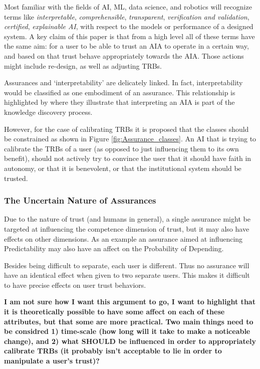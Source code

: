     Most familiar with the fields of AI, ML, data science, and robotics will recognize terms like \emph{interpretable}, \emph{comprehensible}, \emph{transparent}, \emph{verification and validation}, \emph{certified}, \emph{explainable AI}, with respect to the models or performance of a designed system. A key claim of this paper is that from a high level all of these terms have the same aim: for a user to be able to trust an AIA to operate in a certain way, and based on that trust behave appropriately towards the AIA. Those actions might include re-design, as well as adjusting TRBs.

    Assurances and `interpretability' are delicately linked. In fact, interpretability would be classified as one embodiment of an assurance. This relationship is highlighted by \citet{Vellido2012-nm} where they illustrate that interpreting an AIA is part of the knowledge discovery process.

    
    
    
    

    However, for the case of calibrating TRBs it is proposed that the classes should be constrained as shown in Figure \ref{fig:Assurance_classes}. An AI that is trying to calibrate the TRBs of a user (as opposed to just influencing them to its own benefit), should not actively try to convince the user that it should have faith in autonomy, or that it is benevolent, or that the institutional system should be trusted.

    \subsubsection{The Uncertain Nature of Assurances}
        Due to the nature of trust (and humans in general), a single assurance might be targeted at influencing the competence dimension of trust, but it may also have effects on other dimensions. As an example an assurance aimed at influencing Predictability may also have an affect on the Probability of Depending.

        Besides being difficult to separate, each user is different. Thus no assurance will have an identical effect when given to two separate users. This makes it difficult to have precise effects on user trust behaviors.

        \textbf{I am not sure how I want this argument to go, I want to highlight that it is theoretically possible to have some affect on each of these attributes, but that some are more practical. Two main things need to be considred 1) time-scale (how long will it take to make a noticeable change), and 2) what SHOULD be influenced in order to appropriately calibrate TRBs (it probably isn't acceptable to lie in order to manipulate a user's trust)?}

